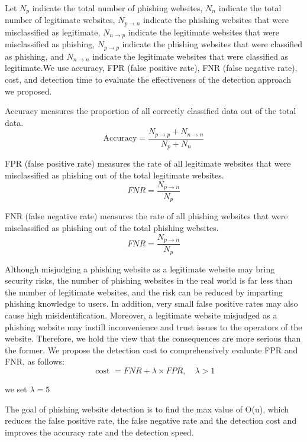\documentclass{ieeeaccess}
\begin{document}
\par Let $N_{p}$ indicate the total number of phishing websites, $N_{n}$ indicate the total number of legitimate websites, $N_{p \rightarrow n}$ indicate the phishing websites that were misclassified as
legitimate, $N_{n \rightarrow p}$ indicate the legitimate websites that were
misclassified as phishing, $N_{p \rightarrow p}$ indicate the phishing websites
that were classified as phishing, and $N_{n \rightarrow n}$ indicate the
legitimate websites that were classified as legitimate.We use accuracy, FPR (false positive rate), FNR (false negative rate), cost, and detection time to evaluate the effectiveness of the detection approach we proposed.
\par Accuracy measures the proportion of all correctly classified data out of the total data.
\begin{equation}
\text {Accuracy}=\frac{N_{p \rightarrow p}+N_{n \rightarrow n}}{N_{p}+N_{n}}
\end{equation}
\par FPR (false positive rate) measures the rate of all legitimate
websites that were misclassified as phishing out of the total
legitimate websites.
\begin{equation}
F N R=\frac{N_{p \rightarrow n}}{N_{p}}
\end{equation}
\par FNR (false negative rate) measures the rate of all phishing
websites that were misclassified as phishing out of the total
phishing websites.
\begin{equation}
F N R=\frac{N_{p \rightarrow n}}{N_{p}}
\end{equation}
\par Although misjudging a phishing website as a legitimate website may bring security risks, the number of phishing websites in the real world is far less than the number of legitimate websites, and the risk can be reduced by imparting
phishing knowledge to users. In addition, very small false positive rates may also cause high misidentification. Moreover, a legitimate website misjudged as a phishing website may instill inconvenience and trust issues to the operators of the website. Therefore, we hold the view that the consequences are more serious than the former. We propose the detection cost to comprehensively evaluate FPR and FNR, as follows:
\begin{equation}
\text { cost }=F N R+\lambda \times F P R, \quad \lambda>1
\end{equation}
\par we set $\lambda = 5$
\par The goal of phishing website detection is to find the max
value of O(u), which reduces the false positive rate, the false negative rate and the detection cost and improves the accuracy rate and the detection speed.
\end{document}
